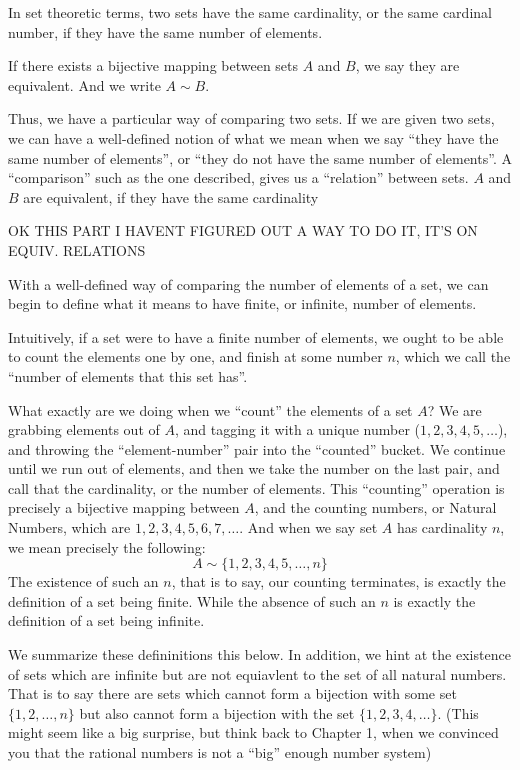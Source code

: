 \documentclass[../../templates/section]{subfiles}
\begin{document}
In set theoretic terms, two sets have the same cardinality, or the same
cardinal number, if they have the same number of elements.

\begin{definition}
If there exists a bijective mapping between sets $A$ and $B$, we say they are 
equivalent. And we write $A \sim B$.
\end{definition}

Thus, we have a particular way of comparing two sets. If we are given two sets,
we can have a well-defined notion of what we mean when we say ``they have the
same number of elements'', or ``they do not have the same number of elements''.
A ``comparison'' such as the one described, gives us a ``relation'' between
sets. $A$ and $B$ are equivalent, if they have the same cardinality

OK THIS PART I HAVENT FIGURED OUT A WAY TO DO IT, IT'S ON EQUIV. RELATIONS

With a well-defined way of comparing the number of elements of a set, we can
begin to define what it means to have finite, or infinite, number of elements.

Intuitively, if a set were to have a finite number of elements, we ought to be 
able to count the elements one by one, and finish at some number $n$, which we
call the ``number of elements that this set has''. 

What exactly are we doing when we ``count'' the elements of a set $A$? We are
grabbing elements out of $A$, and tagging it with a unique number ($1, 2, 3, 4,
5, \ldots$), and throwing the ``element-number'' pair into the ``counted''
bucket. We continue until we run out of elements, and then we take the number
on the last pair, and call that the cardinality, or the number of elements.
This ``counting'' operation is precisely a bijective mapping between $A$, and
the counting numbers, or Natural Numbers, which are $1, 2, 3, 4, 5, 6, 7,
\ldots$. And when we say set $A$ has cardinality $n$, we mean precisely the
following:
\[
A \sim \{1, 2, 3, 4, 5,\ldots, n\}
\]
The existence of such an $n$, that is to say, our counting terminates, is
exactly the definition of a set being finite.  While the absence of such an $n$
is exactly the definition of a set being infinite. 

We summarize these defininitions this below. In addition, we hint at the
existence of sets which are infinite but are not equiavlent to the set of all
natural numbers. That is to say there are sets which cannot form a bijection
with some set $\{1, 2, \ldots, n\}$ but also cannot form a bijection with the
set $\{1, 2, 3, 4, \ldots\}$.  (This might seem like a big surprise, but think
back to Chapter 1, when we convinced you that the rational numbers is not a
``big'' enough number system)
\end{document}
